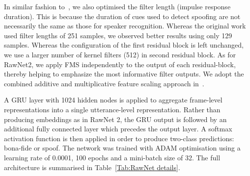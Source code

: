 \documentclass{article}
\begin{document}
In similar fashion to~\cite{jung2020improved}, we also optimised the filter length (impulse response duration). This is because the duration of cues used to detect spoofing are not necessarily the same as those for speaker recognition. Whereas the original work used filter lengths of 251 samples, we observed better results using only 129 samples.
Whereas the configuration of the first residual block is left unchanged, we use a larger number of kernel filters (512) in second residual block. As for RawNet2, we apply FMS independently to the output of each residual-block, thereby helping to emphasize the most informative filter outputs. We adopt the combined additive and multiplicative feature scaling approach in~\cite{jung2020improved}.


A GRU layer with 1024 hidden nodes is applied to aggregate frame-level representations into a single utterance-level representation. Rather than producing embeddings as in RawNet 2, the GRU output is followed by an additional fully connected layer which precedes the output layer. A softmax activation function is then applied in order to produce two-class predictions: bona-fide or spoof. The network was trained with ADAM optimisation using a learning rate of 0.0001, 100 epochs and a mini-batch size of 32. The full architecture is summarised in Table~\ref{Tab:RawNet details}. 

\label{sec:typestyle}
\end{document}
